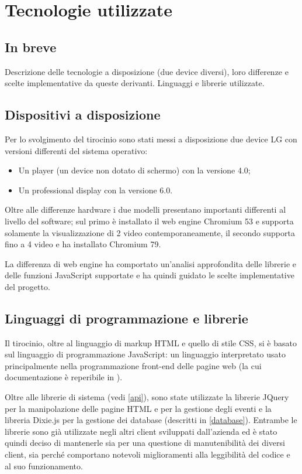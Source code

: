 \chapter{Tecnologie utilizzate}

\section{In breve}
Descrizione delle tecnologie a disposizione (due device diversi), loro differenze e scelte implementative da queste derivanti. Linguaggi e librerie utilizzate. 

\section{Dispositivi a disposizione}
Per lo svolgimento del tirocinio sono stati messi a disposizione due device LG con versioni differenti del sistema operativo:
\begin{itemize}
    \item Un player (un device non dotato di schermo) con la versione 4.0;
    \item Un professional display con la versione 6.0.
\end{itemize}

Oltre alle differenze hardware i due modelli presentano importanti differenti al livello del software; sul primo è installato il web engine Chromium 53 e supporta solamente la visualizzazione di 2 video contemporaneamente, il secondo supporta fino a 4 video e ha installato Chromium 79.

La differenza di web engine ha comportato un'analisi approfondita delle librerie e delle funzioni JavaScript supportate e ha quindi guidato le scelte implementative del progetto.


\section{Linguaggi di programmazione e librerie} \label{linguaggi}

Il tirocinio, oltre al linguaggio di markup HTML e quello di stile CSS, si è basato sul linguaggio di programmazione JavaScript: un linguaggio interpretato usato principalmente nella programmazione front-end delle pagine web (la cui documentazione è reperibile in \cite{MdN}).

Oltre alle librerie di sistema (vedi \ref{api}), sono state utilizzate la librerie JQuery \cite{jQDoc} per la manipolazione delle pagine HTML e per la gestione degli eventi e la libreria Dixie.js \cite{dixie} per la gestione dei database (descritti in \ref*{database}). Entrambe le librerie sono già utilizzate negli altri client sviluppati dall'azienda ed è stato quindi deciso di mantenerle sia per una questione di manutenibilità dei diversi client, sia perché comportano notevoli miglioramenti alla leggibilità del codice e al suo funzionamento.

